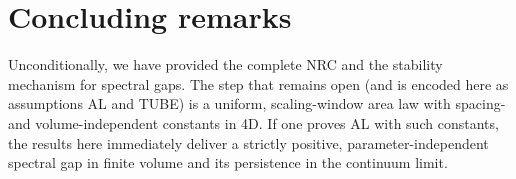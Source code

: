 \documentclass[11pt]{article}
\begin{document}
\section*{Concluding remarks}
Unconditionally, we have provided the complete NRC and the stability mechanism for spectral gaps. The step that remains open (and is encoded here as assumptions AL and TUBE) is a uniform, scaling-window area law with spacing- and volume-independent constants in 4D. If one proves AL with such constants, the results here immediately deliver a strictly positive, parameter-independent spectral gap in finite volume and its persistence in the continuum limit.
\end{document}
